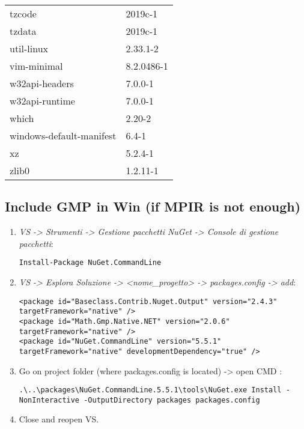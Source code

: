 \documentclass[10pt, english, openany]{report}
\begin{document}
\begin{appendices}
\begin{center}
\begin{tabular}{|m{3cm}|m{3cm}|}
tzcode & 2019c-1 \\
tzdata & 2019c-1 \\
util-linux & 2.33.1-2 \\
vim-minimal & 8.2.0486-1 \\
w32api-headers & 7.0.0-1 \\
w32api-runtime & 7.0.0-1 \\
which & 2.20-2 \\
windows-default-manifest & 6.4-1 \\
xz & 5.2.4-1 \\
zlib0 & 1.2.11-1 \\
\hline
\end{tabular}
\end{center}

\subsection{Include GMP in Win (if MPIR is not enough)}

\begin{enumerate}
\item \textit{VS -> Strumenti -> Gestione pacchetti NuGet -> Console di gestione pacchetti}:
	
\begin{lstlisting}
Install-Package NuGet.CommandLine
\end{lstlisting}	

\item \textit{VS -> Esplora Soluzione -> <nome\_progetto> -> packages.config -> add}: 

\begin{lstlisting}
<package id="Baseclass.Contrib.Nuget.Output" version="2.4.3" targetFramework="native" />
<package id="Math.Gmp.Native.NET" version="2.0.6" targetFramework="native" />
<package id="NuGet.CommandLine" version="5.5.1" targetFramework="native" developmentDependency="true" />
\end{lstlisting}
		

\item Go on project folder (where packages.config is located) -> open CMD :

\begin{lstlisting}
.\..\packages\NuGet.CommandLine.5.5.1\tools\NuGet.exe Install -NonInteractive -OutputDirectory packages packages.config
\end{lstlisting}
	
\item Close and reopen VS.


\end{enumerate}
\end{appendices}
\end{document}
